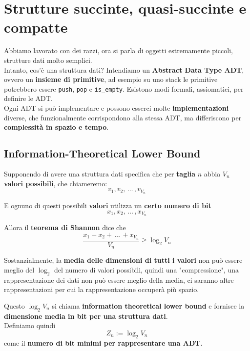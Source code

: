 
\section{Strutture succinte, quasi-succinte e compatte}
Abbiamo lavorato con dei razzi, ora si parla di oggetti estremamente piccoli, strutture dati molto semplici.\\

Intanto, cos'è una struttura dati? Intendiamo un \textbf{Abstract Data Type ADT}, ovvero un \textbf{insieme di primitive}, ad esempio su uno stack le primitive potrebbero essere \texttt{push}, \texttt{pop} e \texttt{is\_empty}. Esistono modi formali, assiomatici, per definire le ADT.\\

Ogni ADT si può implementare e possono esserci molte \textbf{implementazioni} diverse, che funzionalmente corrispondono alla stessa ADT, ma differiscono per \textbf{complessità in spazio e tempo}.\\

\subsection{Information-Theoretical Lower Bound}

Supponendo di avere una struttura dati specifica che per \textbf{taglia} $n$ abbia $V_n$ \textbf{valori possibili}, che chiameremo: 
$$ v_1, v_2, \, \dots \, , v_{V_n} $$

E ognuno di questi possibili \textbf{valori} utilizza un \textbf{certo numero di bit}
$$ x_1, x_2, \, \dots \, , x_{V_n}$$

Allora il \textbf{teorema di Shannon} dice che
$$ \frac{x_1 + x_2 + \, \dots \, + x_{V_n}}{V_n} \geq \log_2 V_n $$

Sostanzialmente, la \textbf{media delle dimensioni di tutti i valori} non può essere meglio del $\log_2$ del numero di valori possibili, quindi una "compressione", una rappresentazione dei dati non può essere meglio della media, ci saranno altre rappresentazioni per cui la rappresentazione occuperà più spazio.\\

\newpage

Questo $\log_2 V_n$ si chiama \textbf{information theoretical lower bound} e fornisce la \textbf{dimensione media in bit per una struttura dati}.\\

Definiamo quindi 
$$ Z_n := \log_2 V_n$$
come il \textbf{numero di bit minimi per rappresentare una ADT}.\\

